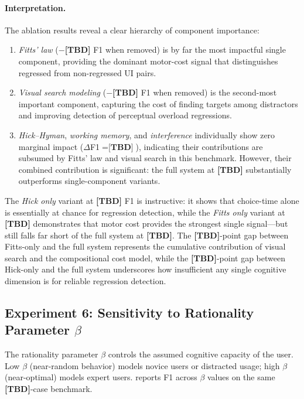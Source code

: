 \documentclass[11pt,twocolumn]{article}
\theoremstyle{definition}
\begin{document}
\paragraph{Interpretation.}
The ablation results reveal a clear hierarchy of component importance:
\begin{enumerate}[nosep]
\item \emph{Fitts' law} ($-$\textbf{[TBD]} F1 when removed) is by far the most impactful single component, providing the dominant motor-cost signal that distinguishes regressed from non-regressed UI pairs.
\item \emph{Visual search modeling} ($-$\textbf{[TBD]} F1 when removed) is the second-most important component, capturing the cost of finding targets among distractors and improving detection of perceptual overload regressions.
\item \emph{Hick--Hyman}, \emph{working memory}, and \emph{interference} individually show zero marginal impact ($\Delta$F1${}=\textbf{[TBD]}$), indicating their contributions are subsumed by Fitts' law and visual search in this benchmark. However, their combined contribution is significant: the full system at \textbf{[TBD]} substantially outperforms single-component variants.
\end{enumerate}

The \emph{Hick only} variant at \textbf{[TBD]} F1 is instructive: it shows that choice-time alone is essentially at chance for regression detection, while the \emph{Fitts only} variant at \textbf{[TBD]} demonstrates that motor cost provides the strongest single signal---but still falls far short of the full system at \textbf{[TBD]}.
The \textbf{[TBD]}-point gap between Fitts-only and the full system represents the cumulative contribution of visual search and the compositional cost model, while the \textbf{[TBD]}-point gap between Hick-only and the full system underscores how insufficient any single cognitive dimension is for reliable regression detection.

\subsection{Experiment 6: Sensitivity to Rationality Parameter $\beta$}

The rationality parameter $\beta$ controls the assumed cognitive capacity of the user.
Low $\beta$ (near-random behavior) models novice users or distracted usage; high $\beta$ (near-optimal) models expert users.
 reports F1 across $\beta$ values on the same \textbf{[TBD]}-case benchmark.
\end{document}
